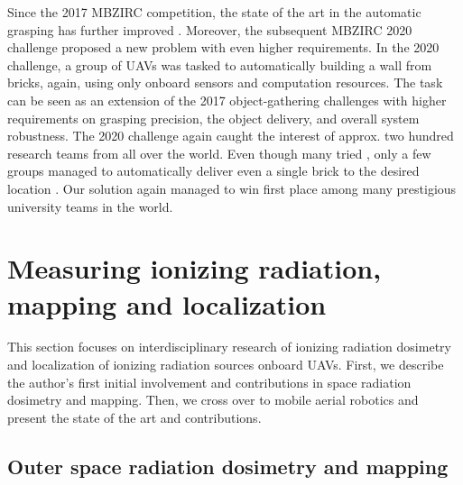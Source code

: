 \documentclass[a4paper,11pt,twoside,openright]{book}
\begin{document}
Since the 2017 \ac{MBZIRC} competition, the state of the art in the automatic grasping has further improved \cite{ruggiero2018aerial, feng2020packages}.
Moreover, the subsequent \ac{MBZIRC} 2020 challenge proposed a new problem with even higher requirements.
In the 2020 challenge, a group of \acp{UAV} was tasked to automatically building a wall from bricks, again, using only onboard sensors and computation resources.
The task can be seen as an extension of the 2017 object-gathering challenges with higher requirements on grasping precision, the object delivery, and overall system robustness.
The 2020 challenge again caught the interest of approx. two hundred research teams from all over the world.
Even though many tried \cite{lenz2020autonomous, ankit2020multi}, only a few groups managed to automatically deliver even a single brick to the desired location \cite{baca2020autonomous, lenz2020autonomous, krizmancic2020cooperative}.
Our solution \cite{baca2020autonomous, baca2020mrs} again managed to win first place among many prestigious university teams in the world.



\section{Measuring ionizing radiation, mapping and localization}

This section focuses on interdisciplinary research of ionizing radiation dosimetry and localization of ionizing radiation sources onboard \aclp{UAV}.
First, we describe the author's first initial involvement and contributions in space radiation dosimetry and mapping.
Then, we cross over to mobile aerial robotics and present the state of the art and contributions.


\subsection{Outer space radiation dosimetry and mapping}
\end{document}
